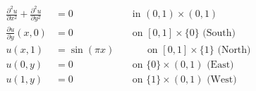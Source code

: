 \begin{align*}
    \frac{\partial^2 u}{\partial x^2} + \frac{\partial^2 u}{\partial y^2} &= 0 \qquad \qquad \qquad \text{in } (0,1)\times (0,1) \\
    \frac{\partial u}{\partial y}(x,0) &= 0 \qquad \qquad \qquad \text{on } [0,1]\times \{0\}    \text{  (South)} \\
    u(x,1) &= \sin(\pi x) \qquad \quad \,\, \text{on } [0,1]\times \{1\} \text{  (North)}\\
    u(0,y) &= 0 \qquad \qquad \qquad \text{on } \{0\}\times (0,1)  \text{  (East)}\\
    u(1,y) &= 0 \qquad \qquad \qquad \text{on } \{1\}\times (0,1)  \text{  (West)}
\end{align*}
    
